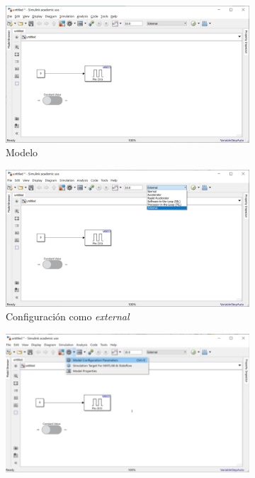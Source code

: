 \documentclass[10pt,a4paper]{report}
\begin{document}
\begin{figure}
\begin{subfigure}{0.5\textwidth}
\centering
\includegraphics[width = \linewidth]{eje1.jpg}
\caption{Modelo}\label{f17a}
\end{subfigure}
\begin{subfigure}{0.5\textwidth}
\centering
\includegraphics[width = \linewidth]{eje2.jpg}
\caption{Configuración como \emph{external}}\label{f17b}
\end{subfigure}
\begin{subfigure}{0.5\textwidth}
\centering
\includegraphics[width = \linewidth]{eje3.jpg}

\end{subfigure}
\end{figure}
\end{document}
